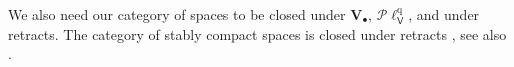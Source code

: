 \documentclass[preprint,12pt]{elsarticle}
\DeclareMathOperator{\upc}{\uparrow\!}
\newcommand\Lform{\mathcal L}
\newcommand\Vt{\mathsf{V}}
\newcommand\quasi{\mathrm{q}} %
\newcommand\QL{\Plotkin^\quasi}
\newcommand\QLV{\QL_\Vt}
\newcommand\Plotkin{\mathcal P\ell} %
\newcommand\Val{{\mathbf V}}
\newcommand\Topcat{\mathbf{Top}}
\begin{document}

We also need our category of spaces to be closed under $\Val_\bullet$,
$\QLV$, and under retracts.  The category of stably compact spaces is
closed under retracts \cite[Proposition, bottom of p.153, and
subsequent discussion]{Lawson:versatile}, see also
\cite[Proposition~2.17]{Jung:scs:prob}.

\end{document}
